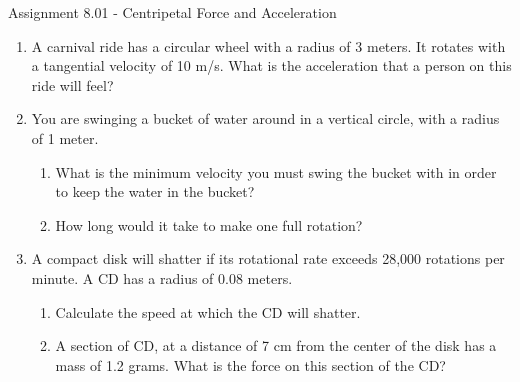 \documentclass[letterpaper, 12pt]{article}
\newcommand{\assnum}{Assignment 8.01}
\newcommand{\assname}{Centripetal Force and Acceleration}
\begin{document}
\fancyfoot[r]{\assnum}	


\begin{center} \assnum{} - \assname{}
\end{center}

\begin{enumerate}
	\item A carnival ride has a circular wheel with a radius of 3 meters.  It rotates with a tangential velocity of 10 m/s.  What is the acceleration that a person on this ride will feel?
	\vspace{1in}
	
	\item You are swinging a bucket of water around in a vertical circle, with a radius of 1 meter.  
	\begin{enumerate}
		\item What is the minimum velocity you must swing the bucket with in order to keep the water in the bucket?
			\vspace{1in}
		\item 	How long would it take to make one full rotation?
			\vspace{1.25in}
	\end{enumerate}
	
	\item A compact disk will shatter if its rotational rate exceeds 28,000 rotations per minute.  A CD has a radius of 0.08 meters.
		\begin{enumerate}
			\item Calculate the speed at which the CD will shatter.
				\vspace{1in}
			\item A section of CD, at a distance of 7 cm from the center of the disk has a mass of 1.2 grams. What is the force on this section of the CD?
				\vspace{1in}
		\end{enumerate}
	

\end{enumerate}
\end{document}
